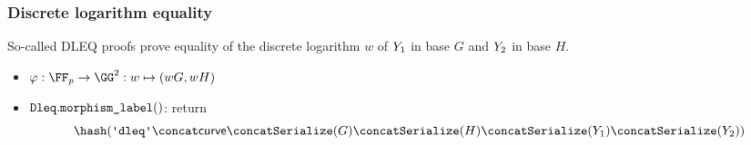 \documentclass[11pt]{article}
\begin{document}

\subsubsection{Discrete logarithm equality}
So-called DLEQ proofs prove equality of the discrete logarithm $w$ of $Y_1$ in base $G$ and $Y_2$ in base $H$.

\begin{itemize}
  \item $\varphi:\FF_p\to\GG^2:w\mapsto (wG,wH)$
  \item $\texttt{Dleq}.\texttt{morphism\_label}()$: return
  \[
    \hash(\dleqlabel \concat \curvectx \concat \serialize(G) \concat \serialize(H) \concat \serialize(\statement_1) \concat \serialize(\statement_2))
  \]
\end{itemize}
\end{document}
